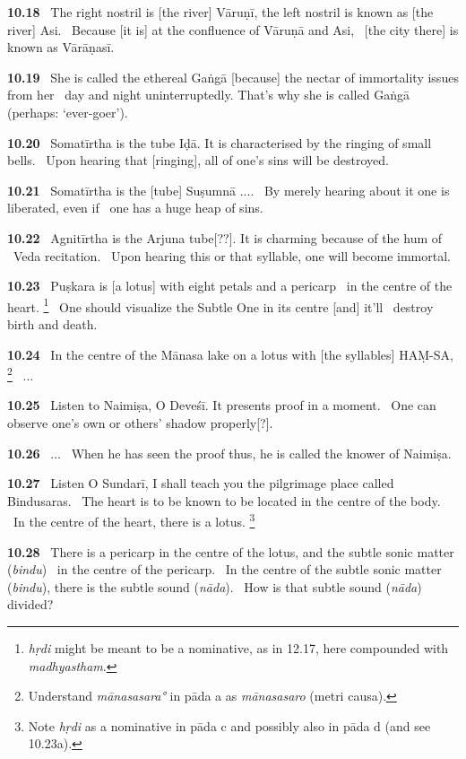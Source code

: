 \documentclass{article}
\newcommand{\skt}[1]{\textit{#1}}
\begin{document}
\textbf{10.18}%
\ The right nostril is [the river] Vāruṇī, the left nostril is known as [the river] Asi.%
\ Because [it is] at the confluence of Vāruṇā and Asi,%
\                         [the city there] is known as Vārāṇasī.%


\textbf{10.19}%
\ She is called the ethereal Gaṅgā [because] the nectar of immortality issues from her%
\ day and night uninterruptedly. That's why she is called Gaṅgā (perhaps: `ever-goer').%


\textbf{10.20}%
\ Somatīrtha is the tube Iḍā. It is characterised by the ringing of small bells.%
\ Upon hearing that [ringing], all of one's sins will be destroyed.%


\textbf{10.21}%
\ Somatīrtha is the [tube] Suṣumnā ....%
\ By merely hearing about it one is liberated, even if%
\                         one has a huge heap of sins.%


\textbf{10.22}%
\ Agnitīrtha is the Arjuna tube[??]. It is charming because of the hum of%
\                         Veda recitation.%
\ Upon hearing this or that syllable, one will become immortal.%


\textbf{10.23}%
\ Puṣkara is [a lotus] with eight petals and a pericarp%
\                                          in the centre of the heart.%
\footnote{\skt{hṛdi} might be meant to be a nominative, as in 12.17, here compounded with \skt{madhyastham}. }%
\ One should visualize the Subtle One in its centre [and] it'll%
\                         destroy birth and death.%


\textbf{10.24}%
\ In the centre of the Mānasa lake on a lotus with [the syllables] HAṂ-SA,%
\footnote{Understand \skt{mānasasara°} in pāda a as \skt{mānasasaro} (metri causa). }%
\ ...%


\textbf{10.25}%
\ Listen to Naimiṣa, O Deveśī. It presents proof in a moment.%
\ One can observe one's own or others' shadow properly[?].%


\textbf{10.26}%
\ ...%
\ When he has seen the proof thus, he is called the knower of Naimiṣa.%


\textbf{10.27}%
\ Listen O Sundarī, I shall teach you the pilgrimage place called Bindusaras.%
\ The heart is to be known to be located in the centre of the body.%
\                  In the centre of the heart, there is a lotus.%
\footnote{Note \skt{hṛdi} as a nominative in pāda c and possibly also in pāda d (and see 10.23a). }%


\textbf{10.28}%
\ There is a pericarp in the centre of the lotus, and the subtle sonic matter (\skt{bindu})%
\                                 in the centre of the pericarp.%
\ In the centre of the subtle sonic matter (\skt{bindu}), there is the subtle sound (\skt{nāda}).%
\                 How is that subtle sound (\skt{nāda}) divided?%
\end{document}
